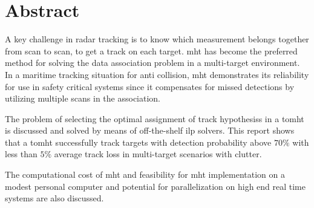 
\section*{Abstract}
A key challenge in radar tracking is to know which \gls{measurement} belongs together from \gls{scan} to \gls{scan}, to get a \gls{track} on each target. \gls{mht} has become the preferred method for solving the data association problem in a multi-target environment. In a maritime tracking situation for anti collision, \gls{mht} demonstrates its reliability for use in safety critical systems since it compensates for missed detections by utilizing multiple \glspl{scan} in the association. 

The problem of selecting the optimal assignment of \glspl{track hypothesis} in a \gls{tomht} is discussed and solved by means of off-the-shelf \gls{ilp} solvers. This report shows that a \gls{tomht} successfully \gls{track} targets with detection probability above $70\%$ with less than $5\%$ average \gls{track} loss in multi-target scenarios with clutter.

The computational cost of \gls{mht} and feasibility for \gls{mht} implementation on a modest personal computer and potential for parallelization on high end real time systems are also discussed.
